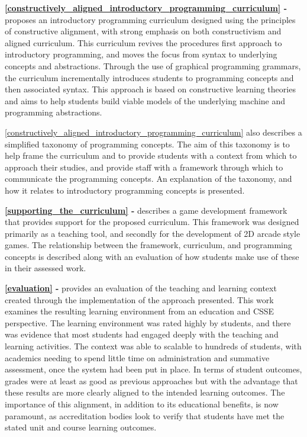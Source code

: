 \textbf{\cref{constructively_aligned_introductory_programming_curriculum} - } proposes an introductory programming curriculum designed using the principles of constructive alignment, with strong emphasis on both constructivism and aligned curriculum. This curriculum revives the procedures first approach to introductory programming, and moves the focus from syntax to underlying concepts and abstractions. Through the use of graphical programming grammars, the curriculum incrementally introduces students to programming concepts and then associated syntax. This approach is based on constructive learning theories and aims to help students build viable models of the underlying machine and programming abstractions. 
 
\cref{constructively_aligned_introductory_programming_curriculum} also describes a simplified taxonomy of programming concepts. The aim of this taxonomy is to help frame the curriculum and to provide students with a context from which to approach their studies, and provide staff with a framework through which to communicate the programming concepts. An explanation of the taxonomy, and how it relates to introductory programming concepts is presented.

\textbf{\cref{supporting_the_curriculum} - } describes a game development framework that provides support for the proposed curriculum. This framework was designed primarily as a teaching tool, and secondly for the development of 2D arcade style games. The relationship between the framework, curriculum, and programming concepts is described along with an evaluation of how students make use of these in their assessed work.

\textbf{\cref{evaluation} - } provides an evaluation of the teaching and learning context created through the implementation of the approach presented. This work examines the resulting learning environment from an education and CSSE perspective. The learning environment was rated highly by students, and there was evidence that most students had engaged deeply with the teaching and learning activities. The context was able to scalable to hundreds of students, with academics needing to spend little time on administration and summative assessment, once the system had been put in place. In terms of student outcomes, grades were at least as good as previous approaches but with the advantage that these results are more clearly aligned to the intended learning outcomes. The importance of this alignment, in addition to its educational benefits, is now paramount, as accreditation bodies look to verify that students have met the stated unit and course learning outcomes. 

